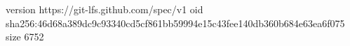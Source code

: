 version https://git-lfs.github.com/spec/v1
oid sha256:46d68a389dc9c93340cd5cf861bb59994e15c43fee140db360b684e63ea6f075
size 6752
